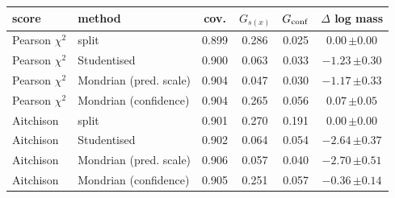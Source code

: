 \begin{tabular}{llcccc}\toprule
score & method & cov. & $G_{s(x)}$ & $G_{\rm conf}$ & $\Delta$ log mass\\\midrule
Pearson $\chi^2$ & split & 0.899 & 0.286 & 0.025 & $0.00\,{\scriptstyle\pm0.00}$\\
Pearson $\chi^2$ & Studentised & 0.900 & 0.063 & 0.033 & $-1.23\,{\scriptstyle\pm0.30}$\\
Pearson $\chi^2$ & Mondrian (pred. scale) & 0.904 & 0.047 & 0.030 & $-1.17\,{\scriptstyle\pm0.33}$\\
Pearson $\chi^2$ & Mondrian (confidence) & 0.904 & 0.265 & 0.056 & $0.07\,{\scriptstyle\pm0.05}$\\
Aitchison & split & 0.901 & 0.270 & 0.191 & $0.00\,{\scriptstyle\pm0.00}$\\
Aitchison & Studentised & 0.902 & 0.064 & 0.054 & $-2.64\,{\scriptstyle\pm0.37}$\\
Aitchison & Mondrian (pred. scale) & 0.906 & 0.057 & 0.040 & $-2.70\,{\scriptstyle\pm0.51}$\\
Aitchison & Mondrian (confidence) & 0.905 & 0.251 & 0.057 & $-0.36\,{\scriptstyle\pm0.14}$\\
\bottomrule\end{tabular}
